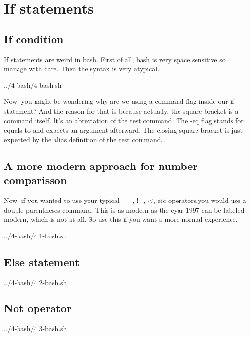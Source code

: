 \chapter{If statements}

\section{If condition}

If statements are weird in bash. First of all, bash is very space sensitive so manage with care.
Then the syntax is very atypical.


{../4-bash/4-bash.sh}

Now, you might be wondering why are we using a command flag inside our if statement? And the reason
for that is because actually, the square bracket is a command itself. It's an abreviation of the
test command. The -eq flag stands for equals to and expects an argument afterward. The closing
square bracket is just expected by the alias definition of the test command.

\section{A more modern approach for number comparisson}

Now, if you wanted to use your typical ==, !=, <, etc operators,you would use a double parentheses
command. This is as modern as the eyar 1997 can be labeled modern, which is not at all. So use this
if you want a more normal experience.


{../4-bash/4.1-bash.sh}
\pagebreak
\section{Else statement}


{../4-bash/4.2-bash.sh}

\section{Not operator}


{../4-bash/4.3-bash.sh}


